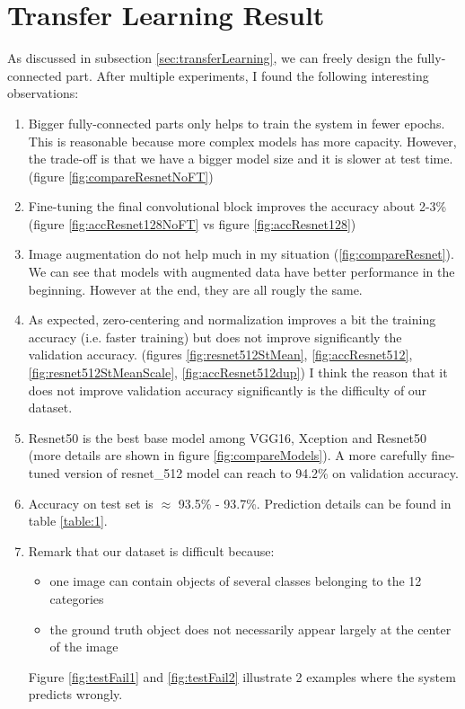\section{Transfer Learning Result}
As discussed in subsection \ref{sec:transferLearning}, we can freely design the fully-connected part. After multiple experiments, I found the following interesting observations:
\begin{enumerate}
	\item Bigger fully-connected parts only helps to train the system in fewer epochs. This is reasonable because more complex models has more capacity. However, the trade-off is that we have a bigger model size and it is slower at test time. (figure \ref{fig:compareResnetNoFT})
	\item Fine-tuning the final convolutional block improves the accuracy about 2-3\% (figure \ref{fig:accResnet128NoFT} vs figure \ref{fig:accResnet128})
	\item Image augmentation do not help much in my situation (\ref{fig:compareResnet}). We can see that models with augmented data have better performance in the beginning. However at the end, they are all rougly the same.
	\item As expected, zero-centering and normalization improves a bit the training accuracy (i.e. faster training) but does not improve significantly the validation accuracy. (figures \ref{fig:resnet512StMean}, \ref{fig:accResnet512}, \ref{fig:resnet512StMeanScale}, \ref{fig:accResnet512dup}) I think the reason that it does not improve validation accuracy significantly is the difficulty of our dataset.
	\item Resnet50 is the best base model among VGG16, Xception and Resnet50 (more details are shown in figure \ref{fig:compareModels}). A more carefully fine-tuned version of resnet\_512 model can reach to 94.2\% on validation accuracy.
	\item Accuracy on test set is $\approx$ 93.5\% - 93.7\%. Prediction details can be found in table \ref{table:1}. 
	\item Remark that our dataset is difficult because:
	\begin{itemize}
		\item one image can contain objects of several classes belonging to the 12 categories
		\item the ground truth object does not necessarily appear largely at the center of the image
	\end{itemize}
	Figure \ref{fig:testFail1} and \ref{fig:testFail2} illustrate 2 examples where the system predicts wrongly.
\end{enumerate}
	

